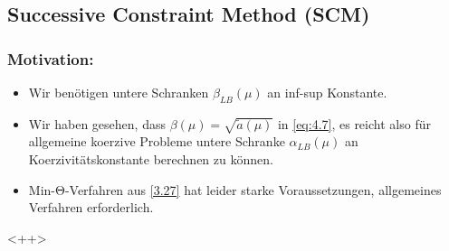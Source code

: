 \subsection*{Successive Constraint Method (SCM)}

\subsubsection*{Motivation:}
\begin{itemize}
	\item Wir benötigen untere Schranken $\beta_{LB}(\mu)$ an inf-sup Konstante.
	\item Wir haben gesehen, dass $\beta(\mu) = \sqrt{\tilde a(\mu)}$ in \eqref{eq:4.7}, es reicht also für allgemeine koerzive Probleme untere Schranke $\alpha_{LB}(\mu)$ an Koerzivitätskonstante berechnen zu können.
	\item Min-$\mathrm\Theta$-Verfahren aus \ref{3.27} hat leider starke Voraussetzungen, allgemeines Verfahren erforderlich.
\end{itemize}<++>
